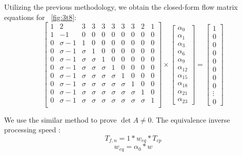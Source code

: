 Utilizing the previous methodology, we obtain the closed-form flow matrix equations for ~\ref{fig:3t8}:
\begin{equation}
{
\left[ \begin{array}{cccccccccc}
1 & 2 & 3 & 3 & 3 & 3 & 3 & 3 & 2 & 1\\
1 & -1 & 0 & 0 & 0 & 0 & 0 & 0 & 0 & 0\\
0 & \sigma-1 & 1 & 0 & 0 & 0 & 0 & 0 & 0 & 0 \\
0 & \sigma-1 & \sigma & 1 & 0 & 0 & 0 & 0 & 0 & 0 \\
0 & \sigma-1 & \sigma & \sigma & 1 & 0 & 0 & 0 & 0 & 0\\
0 & \sigma-1 & \sigma & \sigma & \sigma & 1 & 0 & 0 & 0 & 0\\
0 & \sigma-1 & \sigma & \sigma & \sigma & \sigma & 1 & 0 & 0 & 0\\
0 & \sigma-1 & \sigma & \sigma & \sigma & \sigma & \sigma & 1 & 0 & 0\\
0 & \sigma-1 & \sigma & \sigma & \sigma & \sigma & \sigma & \sigma & 1 & 0\\
0 & \sigma-1 & \sigma & \sigma & \sigma & \sigma & \sigma & \sigma & \sigma & 1 \\
\end{array} 
\right ]} \times \left[ \begin{array}{c}
\alpha_{0} \\
\alpha_{1} \\
\alpha_{3} \\
\alpha_{6} \\
\alpha_{9} \\
\alpha_{12}\\
\alpha_{15}\\
\alpha_{18}\\
\alpha_{21}\\
\alpha_{23}
\end{array} 
\right ] = \left[ \begin{array}{c}
1 \\
0 \\
0 \\
0 \\
0 \\
0 \\
0 \\
0 \\
\vdots \\
0
\end{array} 
\right ]
\end{equation}

We use the similar method to prove $\det A \neq 0$. 
The equivalence inverse processing speed :
$$T_{f,n} = 1*w_{eq}*T_{cp}$$
$$w_{eq} = \alpha_{0}*w$$


